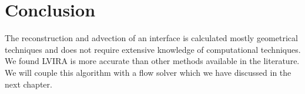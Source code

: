 \section{Conclusion}
The reconstruction and advection of an interface is calculated mostly geometrical techniques and does not require extensive knowledge of computational techniques. We found LVIRA
is more accurate than other methods available in the literature. We will couple this algorithm with a flow solver which we have discussed in the next chapter. 